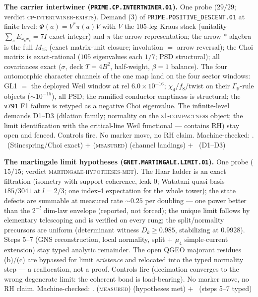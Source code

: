\documentclass[11pt,a4paper]{article}
\theoremstyle{definition}
\begin{document}
\par\smallskip\noindent\textbf{The carrier intertwiner
(\texttt{PRIME.CP.INTERTWINER.01}).}
One probe ($29/29$; verdict \textsc{cp-intertwiner-exists}).
Demand (3) of \texttt{PRIME.POSITIVE\_DESCENT.01} at finite level:
$\Phi(a)=V^{*}\pi(a)V$ with $V$ the $105$-leg Kraus stack
(unitality $\sum_e E_{x_ex_e}=7I$ exact integer) and $\pi$ the arrow
representation; the arrow $*$-algebra is the full $M_{15}$ (exact
matrix-unit closure; involution $=$ arrow reversal); the Choi matrix
is exact-rational ($105$ eigenvalues each $1/7$; PSD structural);
all covariances exact ($\sigma$, deck $T=4B^2$, half-weight,
$\beta=1$ balance).  The four automorphic character channels of the
one map land on the four sector windows: GL1 $=$ the deployed Weil
window at rel $6.0\times10^{-16}$; $\chi_4/f_8$/twist on their
$\Gamma_{\mathbb R}$-rule objects (${\sim}10^{-15}$), all PSD; the
ramified conductor emptiness is structural; the \texttt{v791} F1
failure is retyped as a negative Choi eigenvalue.  The
infinite-level demands D1--D3 (dilation family; normality on the
\textsc{z1-compactness} object; the limit identification with the
critical-line Weil functional --- contains RH) stay open and
fenced.  Controls fire.  No marker move, no RH claim.
Machine-checked: .
\mE\ (Stinespring/Choi exact) $+$ (\textsc{measured}) (channel
landings) $+$ \mO\ (D1--D3)
\par\smallskip

\par\smallskip\noindent\textbf{The martingale limit hypotheses
(\texttt{GNET.MARTINGALE.LIMIT.01}).}
One probe ($15/15$; verdict \textsc{martingale-hypotheses-met}).
The Haar ladder is an exact filtration (isometry with support
coherence, leak $0$; Watatani quasi-basis $185/3041$ at $l=2/3$;
one index-4 expectation for the whole tower); the state defects are
summable at measured rate ${\sim}0.25$ per doubling --- one power
better than the $2^{-l}$ dim-law envelope (reported, not forced);
the unique limit follows by elementary telescoping and is verified
on every rung; the split/normality precursors are uniform
(determinant witness $D_k\ge0.985$, stabilizing at $0.9928$).
Steps 5--7 (GNS reconstruction, local normality, split $+$ $\mu_4$
simple-current extension) stay typed analytic remainder.  The open
QGEO majorant residues (b)/(c) are bypassed for limit
\emph{existence} and relocated into the typed normality step --- a
reallocation, not a proof.  Controls fire (decimation converges to
the wrong degenerate limit: the coherent bond is load-bearing).  No
marker move, no RH claim.
Machine-checked: .
(\textsc{measured}) (hypotheses met) $+$ \mO\ (steps 5--7 typed)
\par\smallskip
\end{document}
